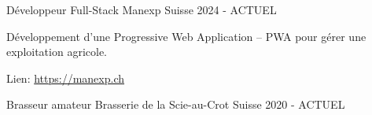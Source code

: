 

\begin{cventries}

    \cventry
    {Développeur Full-Stack} %
    {Manexp} %
    {Suisse} %
    {2024 - ACTUEL} %
    {
      \begin{cvitems} %
        \item {Développement d'une Progressive Web Application -- PWA pour gérer une exploitation agricole.}
        \item {Lien: \href{https://manexp.ch}{https://manexp.ch}}
      \end{cvitems}
    }

    \cventry
    {Brasseur amateur} %
    {Brasserie de la Scie-au-Crot} %
    {Suisse} %
    {2020 - ACTUEL} %
    {}

\end{cventries}
